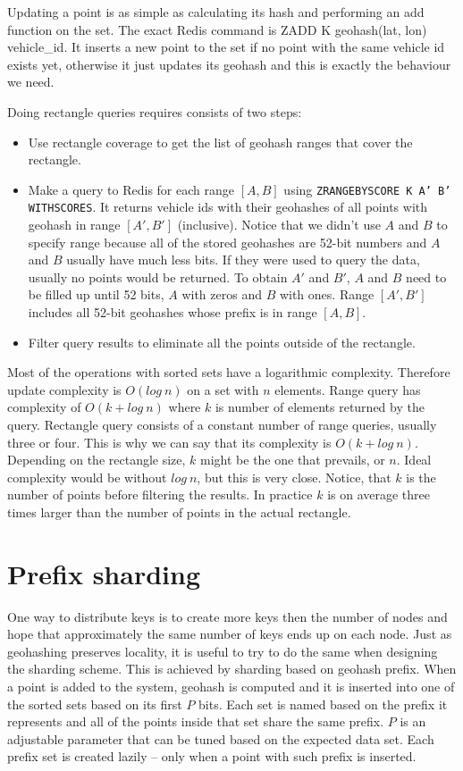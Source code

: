 \documentclass[times, utf8, diplomski]{fer}
\begin{document}
Updating a point is as simple as calculating its hash and performing an add function on the set. The exact Redis command is ZADD K geohash(lat, lon) vehicle\_id. It inserts a new point to the set if no point with the same vehicle id exists yet, otherwise it just updates its geohash and this is exactly the behaviour we need.

Doing rectangle queries requires consists of two steps:
\begin{itemize}
\item Use rectangle coverage to get the list of geohash ranges that cover the rectangle.
\item Make a query to Redis for each range $[A, B]$ using \texttt{ZRANGEBYSCORE K A' B' WITHSCORES}. It returns vehicle ids with their geohashes of all points with geohash in range $[A', B']$ (inclusive). Notice that we didn't use $A$ and $B$ to specify range because all of the stored geohashes are 52-bit numbers and $A$ and $B$ usually have much less bits. If they were used to query the data, usually no points would be returned. To obtain $A'$ and $B'$, $A$ and $B$ need to be filled up until 52 bits, $A$ with zeros and $B$ with ones. Range $[A',B']$ includes all 52-bit geohashes whose prefix is in range $[A,B]$.
\item Filter query results to eliminate all the points outside of the rectangle.
\end{itemize}

Most of the operations with sorted sets have a logarithmic complexity. Therefore update complexity is $O(log\ n)$ on a set with $n$ elements. Range query has complexity of $O(k + log\ n)$ where $k$ is number of elements returned by the query. Rectangle query consists of a constant number of range queries, usually three or four. This is why we can say that its complexity is $O(k + log\ n)$. Depending on the rectangle size, $k$ might be the one that prevails, or $n$. Ideal complexity would be without $log\ n$, but this is very close. Notice, that $k$ is the number of points before filtering the results. In practice $k$ is on average three times larger than the number of points in the actual rectangle.

\section {Prefix sharding} \label {prefix}
One way to distribute keys is to create more keys then the number of nodes and hope that approximately the same number of keys ends up on each node. Just as geohashing preserves locality, it is useful to try to do the same when designing the sharding scheme. This is achieved by sharding based on geohash prefix. When a point is added to the system, geohash is computed and it is inserted into one of the sorted sets based on its first $P$ bits. Each set is named based on the prefix it represents and all of the points inside that set share the same prefix. $P$ is an adjustable parameter that can be tuned based on the expected data set. Each prefix set is created lazily -- only when a point with such prefix is inserted.
\end{document}
